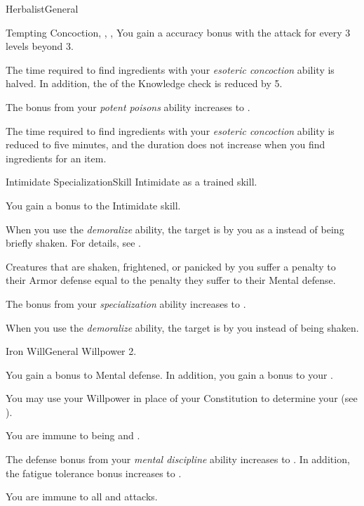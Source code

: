 \begin{feat}{Herbalist}{General}
\begin{attuneability}{Tempting Concoction}{, , , }
            \rankline
            You gain a  accuracy bonus with the attack for every 3 levels beyond 3.
        \end{attuneability}

         The time required to find ingredients with your \textit{esoteric concoction} ability is halved.
        In addition, the  of the Knowledge check is reduced by 5.

         The bonus from your \textit{potent poisons} ability increases to .

         The time required to find ingredients with your \textit{esoteric concoction} ability is reduced to five minutes, and the duration does not increase when you find ingredients for an item.
    \end{feat}

    \begin{feat}{Intimidate Specialization}{Skill}
        \featpre Intimidate as a trained skill.

         You gain a  bonus to the Intimidate skill.

         When you use the \textit{demoralize} ability, the target is \shaken by you as a  instead of being briefly shaken.
        For details, see .

         Creatures that are shaken, frightened, or panicked by you suffer a penalty to their Armor defense equal to the penalty they suffer to their Mental defense.

         The bonus from your \textit{specialization} ability increases to .

         When you use the \textit{demoralize} ability, the target is \frightened by you instead of being shaken.
    \end{feat}

    \begin{feat}{Iron Will}{General}
        \featpre Willpower 2.

         You gain a  bonus to Mental defense.
        In addition, you gain a  bonus to your .

         You may use your Willpower in place of your Constitution to determine your  (see ).

         You are immune to being \dazed and \stunned.

         The defense bonus from your \textit{mental discipline} ability increases to .
        In addition, the fatigue tolerance bonus increases to .

         You are immune to all  and  attacks.
    \end{feat}

